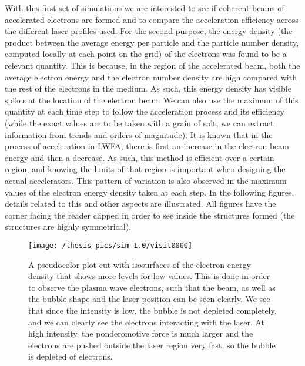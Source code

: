 \documentclass[12pt, class=report, crop=false]{standalone}
\begin{document}
With this first set of simulations we are interested to see if coherent beams of accelerated electrons are formed and to compare the acceleration efficiency across the different laser profiles used. For the second purpose, the energy density (the product between the average energy per particle and the particle number density, computed locally at each point on the grid) of the electrons was found to be a relevant quantity. This is because, in the region of the accelerated beam, both the average electron energy and the electron number density are high compared with the rest of the electrons in the medium. As such, this energy density has visible spikes at the location of the electron beam. We can also use the maximum of this quantity at each time step to follow the acceleration process and its efficiency (while the exact values are to be taken with a grain of salt, we can extract information from trends and orders of magnitude). It is known that in the process of acceleration in LWFA, there is first an increase in the electron beam energy and then a decrease. As such, this method is efficient over a certain region, and knowing the limits of that region is important when designing the actual accelerators. This pattern of variation is also observed in the maximum values of the electron energy density taken at each step. In the following figures, details related to this and other aspects are illustrated. All figures have the corner facing the reader clipped in order to see inside the structures formed (the structures are highly symmetrical).

\begin{figure}[!h]
  \centering
  \texttt{[image: /thesis-pics/sim-1.0/visit0000]}%
  \caption{A pseudocolor plot cut with isosurfaces of the electron energy density that shows more levels for low values. This is done in order to observe the plasma wave electrons, such that the beam, as well as the bubble shape and the laser position can be seen clearly. We see that since the intensity is low, the bubble is not depleted completely, and we can clearly see the electrons interacting with the laser. At high intensity, the ponderomotive force is much larger and the electrons are pushed outside the laser region very fast, so the bubble is depleted of electrons.}
  \label{fig:visit0000}%
\end{figure}
\end{document}
